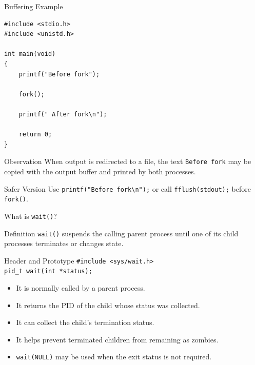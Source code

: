 \documentclass[aspectratio=169]{beamer}
\begin{document}
\begin{frame}[fragile]{Buffering Example}

\begin{lstlisting}[style=cstyle]
#include <stdio.h>
#include <unistd.h>

int main(void)
{
    printf("Before fork");

    fork();

    printf(" After fork\n");

    return 0;
}
\end{lstlisting}

\begin{block}{Observation}
When output is redirected to a file, the text \texttt{Before fork} may be copied
with the output buffer and printed by both processes.
\end{block}

\begin{exampleblock}{Safer Version}
Use \texttt{printf("Before fork\textbackslash n");} or call
\texttt{fflush(stdout);} before \texttt{fork()}.
\end{exampleblock}

\end{frame}

\begin{frame}{What is \texttt{wait()}?}

\begin{block}{Definition}
\texttt{wait()} suspends the calling parent process until one of its child
processes terminates or changes state.
\end{block}

\begin{block}{Header and Prototype}
\centering
\texttt{\#include <sys/wait.h>}\\[0.15cm]
\texttt{pid\_t wait(int *status);}
\end{block}

\begin{itemize}
    \item It is normally called by a parent process.
    \item It returns the PID of the child whose status was collected.
    \item It can collect the child's termination status.
    \item It helps prevent terminated children from remaining as zombies.
    \item \texttt{wait(NULL)} may be used when the exit status is not required.
\end{itemize}

\end{frame}
\end{document}
